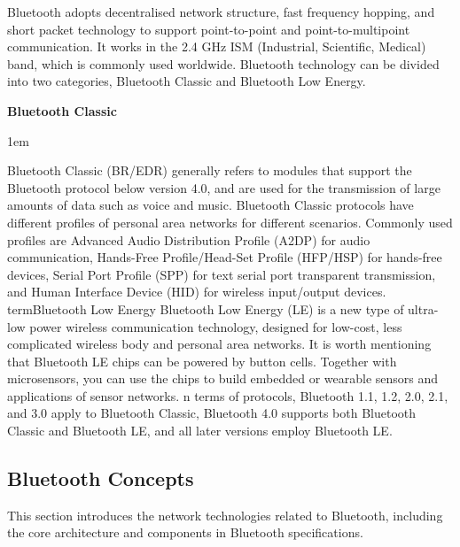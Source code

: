 \documentclass[a4paper,12pt,openany]{book}
\newenvironment{term}[1]{
    \textbf{#1}

    \leftskip 1em
    \parskip 0pt
}
\newcommand{\note}[2][NOTE]{ %
\vspace{6pt}
\begin{tabular}{b{\textwidth}}
\hline
\fontfamily{phv}\selectfont \textbf{#1}\\
\leftskip 1em #2\\
\hline
\end{tabular}
}
\begin{document}

Bluetooth adopts decentralised network structure, fast frequency hopping, and short packet technology to support point-to-point and point-to-multipoint communication. It works in the 2.4 GHz ISM (Industrial, Scientific, Medical) band, which is commonly used worldwide. Bluetooth technology can be divided into two categories, Bluetooth Classic and Bluetooth Low Energy.

\begin{term}{Bluetooth Classic}
    Bluetooth Classic (BR/EDR) generally refers to modules that support the Bluetooth protocol below version 4.0, and are used for the transmission of large amounts of data such as voice and music. Bluetooth Classic protocols have different profiles of personal area networks for different scenarios. Commonly used profiles are Advanced Audio Distribution Profile (A2DP) for audio communication, Hands-Free Profile/Head-Set Profile (HFP/HSP) for hands-free devices, Serial Port Profile (SPP) for text serial port transparent transmission, and Human Interface Device (HID) for wireless input/output devices.
\end{term}

\begin{term}{Bluetooth Low Energy}
    Bluetooth Low Energy (LE) is a new type of ultra-low power wireless communication technology, designed for low-cost, less complicated wireless body and personal area networks. It is worth mentioning that Bluetooth LE chips can be powered by button cells. Together with microsensors, you can use the chips to build embedded or wearable sensors and applications of sensor networks.
\end{term}

In terms of protocols, Bluetooth 1.1, 1.2, 2.0, 2.1, and 3.0 apply to Bluetooth Classic, Bluetooth 4.0 supports both Bluetooth Classic and Bluetooth LE, and all later versions employ Bluetooth LE.

\subsection{Bluetooth Concepts}
This section introduces the network technologies related to Bluetooth, including the core architecture and components in Bluetooth specifications.
\end{document}
